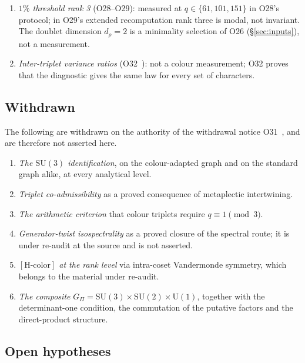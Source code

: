 \documentclass[11pt,a4paper]{article}
\theoremstyle{definition}
\newcommand{\SU}{\mathrm{SU}}
\newcommand{\UU}{\mathrm{U}}
\newcommand{\Gpi}{G_{\Pi}}
\begin{document}
      \begin{enumerate}
        \item \textit{$1\%$ threshold rank 3} (O28--O29):
        measured at $q \in \{61, 101, 151\}$ in O28's protocol; in O29's extended recomputation rank
        three is modal, not invariant.
        The doublet dimension $d_\rho = 2$ is a minimality selection of O26 (§\ref{sec:inputs}),
        not a measurement.

        \item \textit{Inter-triplet variance ratios} (O32~\cite{Beau2026a36}):
        not a colour measurement; O32 proves that the diagnostic gives the same law for every set of
        characters.
      \end{enumerate}

    \subsection{Withdrawn}
      \label{sec:withdrawn}

      The following are withdrawn on the authority of the withdrawal notice
      O31~\cite{Beau2026a35}, and are therefore not asserted here.

      \begin{enumerate}
        \item \textit{The $\SU(3)$ identification}, on the colour-adapted graph and on the
        standard graph alike, at every analytical level.
        \item \textit{Triplet co-admissibility} as a proved consequence of metaplectic
        intertwining.
        \item \textit{The arithmetic criterion} that colour triplets require $q \equiv 1 \pmod 3$.
        \item \textit{Generator-twist isospectrality} as a proved closure of the spectral route;
        it is under re-audit at the source and is not asserted.
        \item \textit{$[\mathrm{H\text{-}color}]$ at the rank level} via intra-coset Vandermonde
        symmetry, which belongs to the material under re-audit.
        \item \textit{The composite} $\Gpi = \SU(3) \times \SU(2) \times \UU(1)$, together with
        the determinant-one condition, the commutation of the putative factors and the
        direct-product structure.
      \end{enumerate}

    \subsection{Open hypotheses}
      \label{sec:open-hyp}
\end{document}
